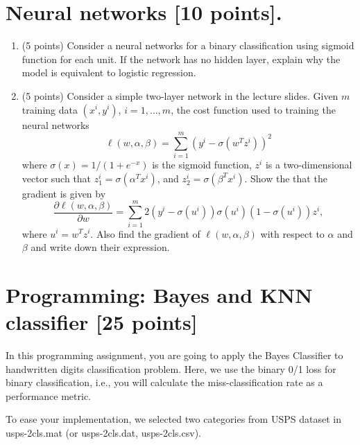 \documentclass[a4paper,12pt,fleqn]{article}
\begin{document}
\clearpage

\section{Neural networks [10 points].}

\begin{enumerate}
\item (5 points)
Consider a neural networks for a binary classification using sigmoid function for each unit. If the network has no hidden layer, explain why the model is equivalent to logistic regression. 
\item (5 points) 
Consider a simple two-layer network in the lecture slides. Given $m$ training data $(x^i, y^i)$, $i = 1, \ldots, m$, the cost function used to training the neural networks
\[
\ell(w, \alpha, \beta) = \sum_{i=1}^m (y^i - \sigma(w^T z^i))^2
\]
where $\sigma (x) = 1/(1+e^{-x})$ is the sigmoid function, $z^i$ is a two-dimensional vector such that  $z_1^i = \sigma(\alpha^T x^i)$, and $z_2^i = \sigma(\beta^T x^i)$. Show the that the gradient is given by
\[
\frac{\partial \ell(w, \alpha, \beta) }{\partial w}
= \sum_{i=1}^m 2(y^i - \sigma(u^i))\sigma(u^i)(1-\sigma(u^i)) z^i,
\]
where $u^i = w^T z^i$. Also find the gradient of $\ell(w, \alpha, \beta)$ with respect to $\alpha$ and $\beta$ and write down their expression.
\end{enumerate}

\clearpage

\section{Programming: Bayes and KNN classifier [25 points]}


In this programming assignment, you are going to apply the Bayes Classifier to handwritten digits classification problem. Here, we use the binary 0/1 loss for binary classification, i.e., you will calculate the miss-classification rate as a performance metric.

To ease your implementation, we selected two categories from USPS dataset in \textsf{usps-2cls.mat} (or \textsf{usps-2cls.dat}, \textsf{usps-2cls.csv}).
\end{document}
